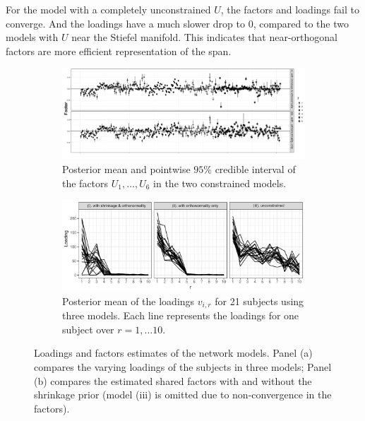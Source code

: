 \documentclass[10pt,fleqn]{article} \pdfoutput=1
\DeclareMathOperator{\1}{\mathbbm{1}} \DeclareMathOperator{\bigO}{\mc O}
\begin{document}
For the model with a completely unconstrained $U$, the factors and loadings fail to converge. And the loadings have a much slower drop to $0$, compared to the two models with $U$ near the Stiefel manifold. This
indicates that near-orthogonal factors are more efficient representation of
the span.

\begin{figure}[H] \centering
	\begin{subfigure}[b]{1\textwidth}
		\includegraphics[width=1\textwidth]{network_factor.pdf}
		\caption{Posterior mean and pointwise $95\%$ credible interval of
			the factors $U_1,\ldots, U_6$ in the two constrained
			models. } \end{subfigure} 
 \begin{subfigure}[b]{0.8\textwidth}
		\includegraphics[width=1\textwidth]{network_loading}
		\caption{Posterior mean of the loadings $v_{i,r}$ for 21 subjects
			using three models. Each line represents the loadings for one
			subject over $r=1,\ldots10$.} \end{subfigure}
			\caption{Loadings and factors estimates
		of the network models. Panel (a) compares the varying loadings of
		the subjects in three models; Panel (b) compares the estimated
		shared factors with and without the shrinkage prior (model (iii) is
		omitted due to non-convergence in the factors).
		\label{network_model_basis}} \end{figure}
\end{document}
